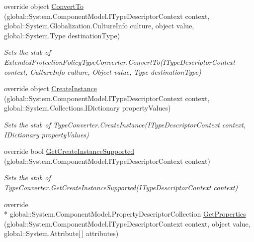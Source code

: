 \begin{DoxyCompactItemize}
override object \hyperlink{class_system_1_1_security_1_1_authentication_1_1_extended_protection_1_1_fakes_1_1_stub_extendedf67afed15bbc0df07bfc91316f6f81f0_a2fa8b16b397e8332ce6c1bd25b634f70}{Convert\-To} (global\-::\-System.\-Component\-Model.\-I\-Type\-Descriptor\-Context context, global\-::\-System.\-Globalization.\-Culture\-Info culture, object value, global\-::\-System.\-Type destination\-Type)
\begin{DoxyCompactList}\small\item\em Sets the stub of Extended\-Protection\-Policy\-Type\-Converter.\-Convert\-To(\-I\-Type\-Descriptor\-Context context, Culture\-Info culture, Object value, Type destination\-Type)\end{DoxyCompactList}\item 
override object \hyperlink{class_system_1_1_security_1_1_authentication_1_1_extended_protection_1_1_fakes_1_1_stub_extendedf67afed15bbc0df07bfc91316f6f81f0_ae43c816a6817574408c3daf8562fe92e}{Create\-Instance} (global\-::\-System.\-Component\-Model.\-I\-Type\-Descriptor\-Context context, global\-::\-System.\-Collections.\-I\-Dictionary property\-Values)
\begin{DoxyCompactList}\small\item\em Sets the stub of Type\-Converter.\-Create\-Instance(\-I\-Type\-Descriptor\-Context context, I\-Dictionary property\-Values)\end{DoxyCompactList}\item 
override bool \hyperlink{class_system_1_1_security_1_1_authentication_1_1_extended_protection_1_1_fakes_1_1_stub_extendedf67afed15bbc0df07bfc91316f6f81f0_aaa393693aaa57ab2e876d13a5f2a2c88}{Get\-Create\-Instance\-Supported} (global\-::\-System.\-Component\-Model.\-I\-Type\-Descriptor\-Context context)
\begin{DoxyCompactList}\small\item\em Sets the stub of Type\-Converter.\-Get\-Create\-Instance\-Supported(\-I\-Type\-Descriptor\-Context context)\end{DoxyCompactList}\item 
override \\*
global\-::\-System.\-Component\-Model.\-Property\-Descriptor\-Collection \hyperlink{class_system_1_1_security_1_1_authentication_1_1_extended_protection_1_1_fakes_1_1_stub_extendedf67afed15bbc0df07bfc91316f6f81f0_ac899229fd719fed0b68b8548615dfe71}{Get\-Properties} (global\-::\-System.\-Component\-Model.\-I\-Type\-Descriptor\-Context context, object value, global\-::\-System.\-Attribute\mbox{[}$\,$\mbox{]} attributes)

\end{DoxyCompactItemize}
